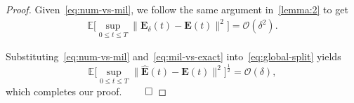 \documentclass[11pt, a4paper, onecolumn]{article}
\newcommand{\E}{\mathbb{E}}
\newcommand{\bfE}{\bf{E}}
\newcommand{\hatE}{\widehat{\bf E}}
\renewcommand{\bf}[1]{\mathbf{#1}}
\newcommand{\calO}{\mathcal{O}}
\newcommand{\half}{{\frac{1}{2}}}
\begin{document}
\begin{appendices}
\begin{proof}
Given~\cref{eq:num-vs-mil}, we follow the same argument in~\cref{lemma:2} to get
\begin{align}\label{eq:mil-vs-exact}
    \E\bigl[\sup_{0\le t\le T}\|\bfE_\delta(t)-\bfE(t)\|^2\bigr]=\calO(\delta^{2}).
\end{align}

Substituting~\eqref{eq:num-vs-mil} and~\eqref{eq:mil-vs-exact}
into~\eqref{eq:global-split} yields
\[
\E\bigl[\sup_{0\le t\le T}\|\hatE(t)-\bfE(t)\|^2\bigr]^{\half}=\calO(\delta),
\]
which completes our proof. $\hfill\qed$
\end{proof}
\end{appendices}

\end{document}
